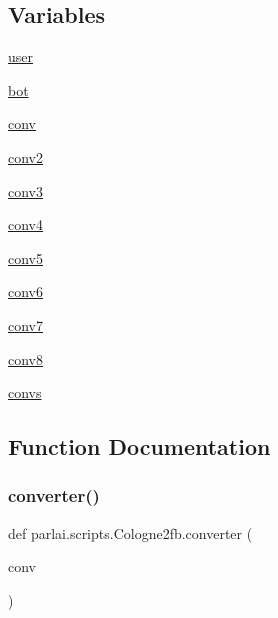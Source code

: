 \subsection*{Variables}
\begin{DoxyCompactItemize}
\item 
\hyperlink{namespaceparlai_1_1scripts_1_1Cologne2fb_a2c2775ea3b77b08039c44de9db5e2302}{user}
\item 
\hyperlink{namespaceparlai_1_1scripts_1_1Cologne2fb_a2daa0c10243dae832a8f536c1af3f401}{bot}
\item 
\hyperlink{namespaceparlai_1_1scripts_1_1Cologne2fb_a9cdaab7c6b5d02bcf42de03da00fa817}{conv}
\item 
\hyperlink{namespaceparlai_1_1scripts_1_1Cologne2fb_a5cc1bac96c382d42d0de484c9a132afa}{conv2}
\item 
\hyperlink{namespaceparlai_1_1scripts_1_1Cologne2fb_a6f6c61af667625808d3554bc1a8cac7b}{conv3}
\item 
\hyperlink{namespaceparlai_1_1scripts_1_1Cologne2fb_af399596e05aa1c02f7cc74cb8b449861}{conv4}
\item 
\hyperlink{namespaceparlai_1_1scripts_1_1Cologne2fb_acdf2c80ef97e5b6e69ea92d38484445e}{conv5}
\item 
\hyperlink{namespaceparlai_1_1scripts_1_1Cologne2fb_aee103b86f514b05352951131adbc0971}{conv6}
\item 
\hyperlink{namespaceparlai_1_1scripts_1_1Cologne2fb_a6d3a522854ceb9dbba1b0f043af8b9fb}{conv7}
\item 
\hyperlink{namespaceparlai_1_1scripts_1_1Cologne2fb_a960be2b5161d03a0d299f271df580d8a}{conv8}
\item 
\hyperlink{namespaceparlai_1_1scripts_1_1Cologne2fb_aa6c7de7860100333b7a5b24578491867}{convs}
\end{DoxyCompactItemize}


\subsection{Function Documentation}
\mbox{\label{namespaceparlai_1_1scripts_1_1Cologne2fb_a1600997b7fde85c597ea9ec986997276}} 
\subsubsection{\texorpdfstring{converter()}{converter()}}
{\footnotesize\ttfamily def parlai.\+scripts.\+Cologne2fb.\+converter (\begin{DoxyParamCaption}\item[{}]{conv }\end{DoxyParamCaption})}

